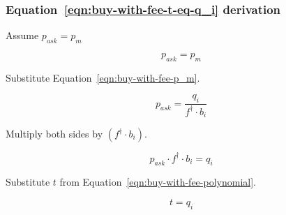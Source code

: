 \subsubsection{Equation~\ref{eqn:buy-with-fee-t-eq-q_i} derivation}%
\label{sssec:equation-eqn-buy-with-fee-t-eq-q-i-derivation}

Assume $p_{ask} = p_m$

\begin{equation*}
	p_{ask} = p_m
\end{equation*}

Substitute Equation~\ref{eqn:buy-with-fee-p_m}.

\begin{equation*}
	p_{ask} = \frac{q_i}{f^{\dagger} \cdot b_i}
\end{equation*}

Multiply both sides by $(f^{\dagger} \cdot b_i)$.

\begin{equation*}
	p_{ask} \cdot f^{\dagger} \cdot b_i = q_i
\end{equation*}

Substitute $t$ from Equation~\ref{eqn:buy-with-fee-polynomial}.

\begin{equation*}
	t = q_i
\end{equation*}
